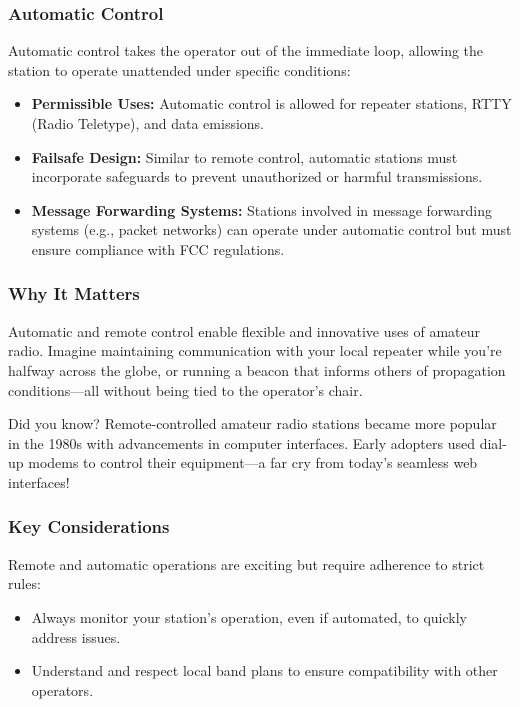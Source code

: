 \subsubsection*{Automatic Control}
Automatic control takes the operator out of the immediate loop, allowing the station to operate unattended under specific conditions:
\begin{itemize}
    \item \textbf{Permissible Uses:} Automatic control is allowed for repeater stations, RTTY (Radio Teletype), and data emissions.
    \item \textbf{Failsafe Design:} Similar to remote control, automatic stations must incorporate safeguards to prevent unauthorized or harmful transmissions.
    \item \textbf{Message Forwarding Systems:} Stations involved in message forwarding systems (e.g., packet networks) can operate under automatic control but must ensure compliance with FCC regulations.
\end{itemize}

\subsubsection*{Why It Matters}
Automatic and remote control enable flexible and innovative uses of amateur radio. Imagine maintaining communication with your local repeater while you’re halfway across the globe, or running a beacon that informs others of propagation conditions—all without being tied to the operator’s chair.

\begin{tcolorbox}[title=Fun Fact: The First Remote-Controlled Stations]
Did you know? Remote-controlled amateur radio stations became more popular in the 1980s with advancements in computer interfaces. Early adopters used dial-up modems to control their equipment—a far cry from today’s seamless web interfaces!
\end{tcolorbox}

\subsubsection*{Key Considerations}
Remote and automatic operations are exciting but require adherence to strict rules:
\begin{itemize}
    \item Always monitor your station’s operation, even if automated, to quickly address issues.
    \item Understand and respect local band plans to ensure compatibility with other operators.
\end{itemize}


